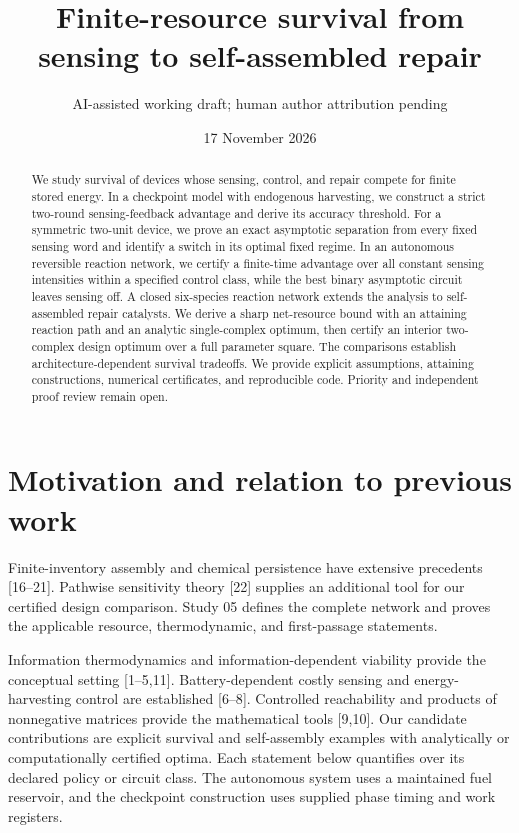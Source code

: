 \documentclass[
  11pt,
]{article}
\title{Finite-resource survival from sensing to self-assembled repair}
\author{AI-assisted working draft; human author attribution pending}
\date{17 November 2026}
\begin{document}
\maketitle
\begin{abstract}
We study survival of devices whose sensing, control, and repair compete
for finite stored energy. In a checkpoint model with endogenous
harvesting, we construct a strict two-round sensing-feedback advantage
and derive its accuracy threshold. For a symmetric two-unit device, we
prove an exact asymptotic separation from every fixed sensing word and
identify a switch in its optimal fixed regime. In an autonomous
reversible reaction network, we certify a finite-time advantage over all
constant sensing intensities within a specified control class, while the
best binary asymptotic circuit leaves sensing off. A closed six-species
reaction network extends the analysis to self-assembled repair
catalysts. We derive a sharp net-resource bound with an attaining
reaction path and an analytic single-complex optimum, then certify an
interior two-complex design optimum over a full parameter square. The
comparisons establish architecture-dependent survival tradeoffs. We
provide explicit assumptions, attaining constructions, numerical
certificates, and reproducible code. Priority and independent proof
review remain open.
\end{abstract}

\section{Motivation and relation to previous
work}\label{motivation-and-relation-to-previous-work}

Finite-inventory assembly and chemical persistence have extensive
precedents {[}16--21{]}. Pathwise sensitivity theory {[}22{]} supplies
an additional tool for our certified design comparison. Study 05 defines
the complete network and proves the applicable resource, thermodynamic,
and first-passage statements.

Information thermodynamics and information-dependent viability provide
the conceptual setting {[}1--5,11{]}. Battery-dependent costly sensing
and energy-harvesting control are established {[}6--8{]}. Controlled
reachability and products of nonnegative matrices provide the
mathematical tools {[}9,10{]}. Our candidate contributions are explicit
survival and self-assembly examples with analytically or computationally
certified optima. Each statement below quantifies over its declared
policy or circuit class. The autonomous system uses a maintained fuel
reservoir, and the checkpoint construction uses supplied phase timing
and work registers.
\end{document}
